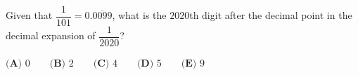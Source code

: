 Given that $\dfrac{1}{101}=0.\overline{0099}$, what is the $2020$th digit after the decimal point in the decimal expansion of $\dfrac{1}{2020}$?

$\textbf{(A) }0\qquad\textbf{(B) }2\qquad\textbf{(C) }4\qquad\textbf{(D) }5\qquad\textbf{(E) }9$
